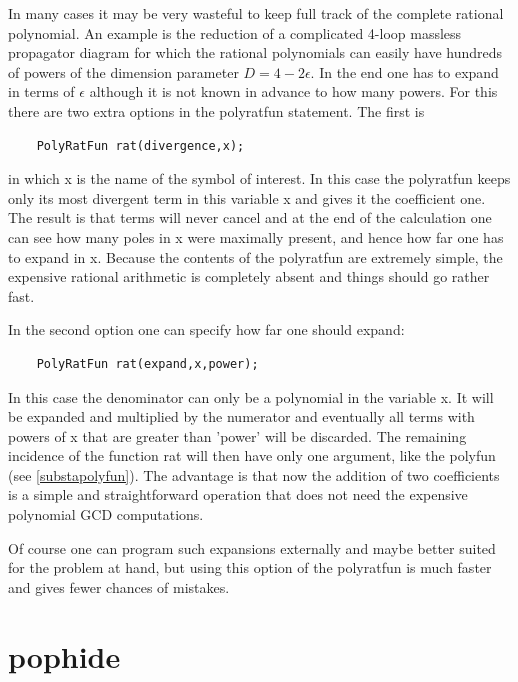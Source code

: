\noindent In many cases it may be very wasteful to keep full track of the 
complete rational polynomial. An example is the reduction of a complicated 
4-loop massless propagator diagram for which the rational polynomials can 
easily have hundreds of powers of the dimension parameter $D=4-2\epsilon$. 
In the end one has to expand in terms of $\epsilon$ although it is not 
known in advance to how many powers. For this there are two extra options 
in the polyratfun statement. The first is
\begin{verbatim}
    PolyRatFun rat(divergence,x);
\end{verbatim}
in which x is the name of the symbol of interest. In this case the 
polyratfun keeps only its most divergent term in this variable x and gives 
it the coefficient one. The result is that terms will never cancel and at 
the end of the calculation one can see how many poles in x were maximally 
present, and hence how far one has to expand in x. Because the contents of 
the polyratfun are extremely simple, the expensive rational arithmetic is 
completely absent and things should go rather fast.

\noindent In the second option one can specify how far one should expand:
\begin{verbatim}
    PolyRatFun rat(expand,x,power);
\end{verbatim}
In this case the denominator can only be a polynomial in the variable x. It 
will be expanded and multiplied by the numerator and eventually all terms 
with powers of x that are greater than 'power' will be discarded. The 
remaining incidence of the function rat will then have only one argument, 
like the polyfun (see \ref{substapolyfun}). The advantage is that now the 
addition of two coefficients is a simple and straightforward operation that 
does not need the expensive polynomial GCD computations.

\noindent Of course one can program such expansions externally and maybe 
better suited for the problem at hand, but using this option of the 
polyratfun is much faster and gives fewer chances of mistakes.

\vspace{10mm}


\section{pophide}
\label{substapophide}

